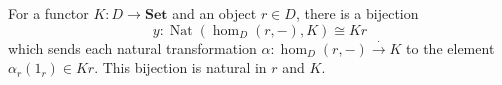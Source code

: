 For a functor $K: D \rightarrow \mathbf{Set}$ and an object $r \in D$, there is a bijection
\[
y: \operatorname{Nat}(\hom_D(r, -), K) \cong Kr
\]
which sends each natural transformation $\alpha: \hom_D(r, -) \xrightarrow{\cdot} K$ to the element $\alpha_r(1_r) \in Kr$. This bijection is natural in $r$ and $K$.